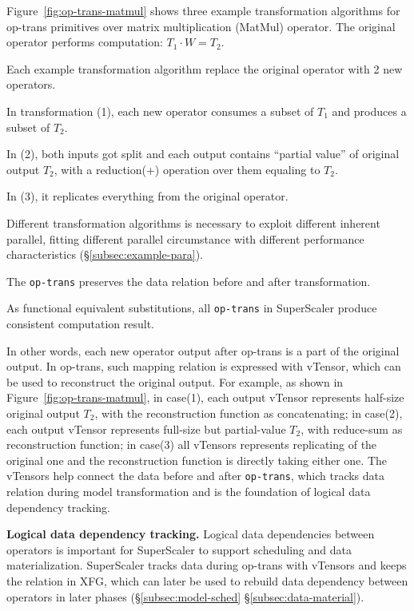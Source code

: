 Figure~\ref{fig:op-trans-matmul} shows three example transformation algorithms for op-trans primitives over matrix multiplication (MatMul) operator. The original operator performs computation: $T_{1} \cdot W = T_{2}$.

Each example transformation algorithm replace the original operator with 2 new operators.

In transformation (1), each new operator consumes a subset of $T_{1}$ and produces a subset of $T_{2}$.

In (2), both inputs got split and each output contains ``partial value'' of original output $T_{2}$, with a reduction(+) operation over them equaling to $T_{2}$.

In (3), it replicates everything from the original operator. 

Different transformation algorithms is necessary to exploit different inherent parallel, fitting different parallel circumstance with different performance characteristics (\S \ref{subsec:example-para}). 

The \texttt{op-trans} preserves the data relation before and after transformation.

As functional equivalent substitutions, all \texttt{op-trans} in {SuperScaler} produce consistent computation result.

In other words, each new operator output after op-trans is a part of the original output. In op-trans, such mapping relation is expressed with vTensor, which can be used to reconstruct the original output. For example, as shown in Figure~\ref{fig:op-trans-matmul}, 
in case(1), each output vTensor represents half-size original output $T_{2}$, with the reconstruction function as concatenating; in case(2), each output vTensor represents full-size but partial-value $T_{2}$, with reduce-sum as reconstruction function; in case(3) all vTensors represents replicating of the original one and the reconstruction function is directly taking either one. The vTensors help connect the data before and after \texttt{op-trans}, which tracks data relation during model transformation and is the foundation of logical data dependency tracking.

{\bf  Logical data dependency tracking. } Logical data dependencies between operators is important for {SuperScaler} to support scheduling and data materialization. {SuperScaler} tracks data during op-trans with vTensors and keeps the relation in XFG, which can later be used to rebuild data dependency between operators in later phases (\S \ref{subsec:model-sched} \S \ref{subsec:data-material}).

